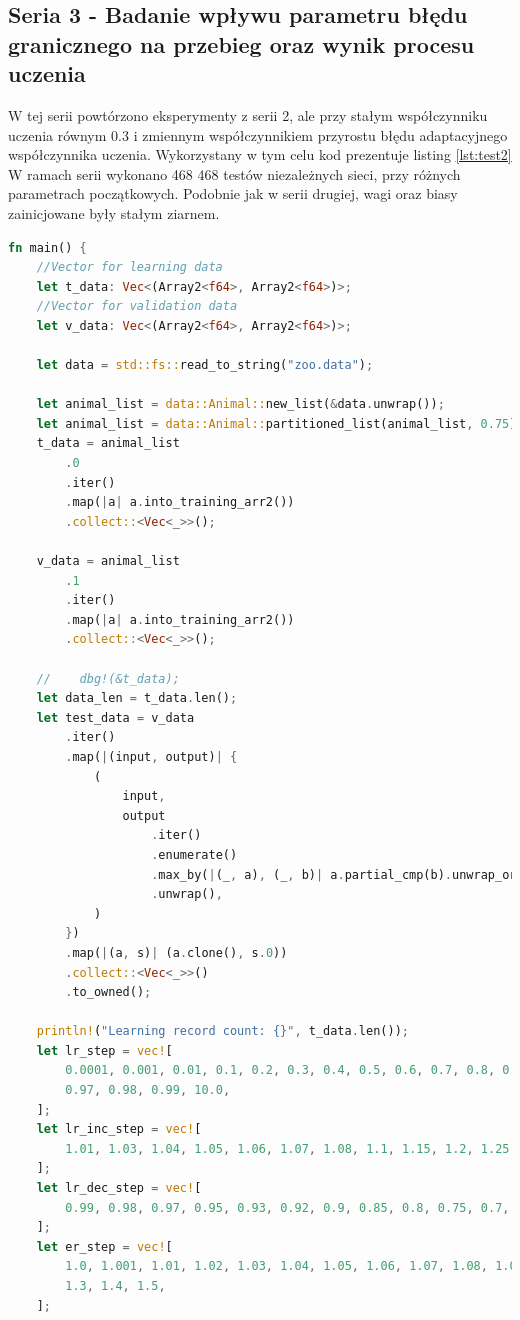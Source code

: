 \documentclass[12pt,twoside]{article}
\begin{document}
\clearpage
\subsection{Seria 3 - Badanie wpływu parametru błędu granicznego na przebieg oraz wynik procesu uczenia}
W tej serii powtórzono eksperymenty z serii 2, ale przy stałym współczynniku uczenia równym 0.3 i zmiennym współczynnikiem przyrostu błędu adaptacyjnego współczynnika uczenia.
Wykorzystany w tym celu kod prezentuje listing \ref{lst:test2}
W ramach serii wykonano 468 468 testów niezależnych sieci, przy różnych parametrach początkowych.
Podobnie jak w serii drugiej, wagi oraz biasy zainicjowane były stałym ziarnem.

\begin{lstlisting}[language=Rust,caption=Kod wykorzystany do przeprowadzenia 3 serii eksperymentów,label={lst:test2}]
	fn main() {
    //Vector for learning data
    let t_data: Vec<(Array2<f64>, Array2<f64>)>;
    //Vector for validation data
    let v_data: Vec<(Array2<f64>, Array2<f64>)>;

    let data = std::fs::read_to_string("zoo.data");

    let animal_list = data::Animal::new_list(&data.unwrap());
    let animal_list = data::Animal::partitioned_list(animal_list, 0.75);
    t_data = animal_list
        .0
        .iter()
        .map(|a| a.into_training_arr2())
        .collect::<Vec<_>>();

    v_data = animal_list
        .1
        .iter()
        .map(|a| a.into_training_arr2())
        .collect::<Vec<_>>();

    //    dbg!(&t_data);
    let data_len = t_data.len();
    let test_data = v_data
        .iter()
        .map(|(input, output)| {
            (
                input,
                output
                    .iter()
                    .enumerate()
                    .max_by(|(_, a), (_, b)| a.partial_cmp(b).unwrap_or(std::cmp::Ordering::Equal))
                    .unwrap(),
            )
        })
        .map(|(a, s)| (a.clone(), s.0))
        .collect::<Vec<_>>()
        .to_owned();

    println!("Learning record count: {}", t_data.len());
    let lr_step = vec![
        0.0001, 0.001, 0.01, 0.1, 0.2, 0.3, 0.4, 0.5, 0.6, 0.7, 0.8, 0.9, 0.92, 0.94, 0.95, 0.96,
        0.97, 0.98, 0.99, 10.0,
    ];
    let lr_inc_step = vec![
        1.01, 1.03, 1.04, 1.05, 1.06, 1.07, 1.08, 1.1, 1.15, 1.2, 1.25, 1.3, 1.4,
    ];
    let lr_dec_step = vec![
        0.99, 0.98, 0.97, 0.95, 0.93, 0.92, 0.9, 0.85, 0.8, 0.75, 0.7, 0.65, 0.6,
    ];
    let er_step = vec![
        1.0, 1.001, 1.01, 1.02, 1.03, 1.04, 1.05, 1.06, 1.07, 1.08, 1.09, 1.1, 1.15, 1.2, 1.25,
        1.3, 1.4, 1.5,
    ];


\end{lstlisting}
\end{document}
